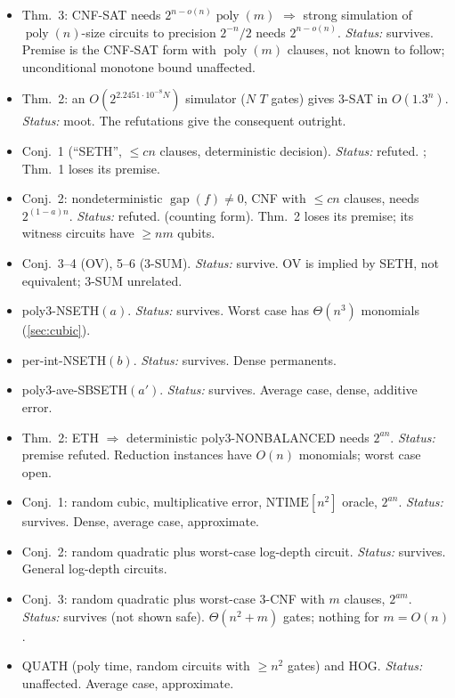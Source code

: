 \documentclass[10pt]{amsart}
\theoremstyle{plain}
\theoremstyle{definition}
\theoremstyle{remark}
\numberwithin{equation}{section}
\newcommand{\poly}{\operatorname{poly}}
\newcommand{\gap}{\operatorname{gap}}
\begin{document}
{\begin{itemize}[leftmargin=2.2em,itemsep=2pt]
\item[10.] \cite{HNS18} Thm.~3: CNF-SAT needs $2^{n-o(n)}\poly(m)$ $\Rightarrow$ strong simulation of $\poly(n)$-size circuits to precision $2^{-n}/2$ needs $2^{n-o(n)}$. \emph{Status:} survives. Premise is the CNF-SAT form with $\poly(m)$ clauses, not known to follow; unconditional monotone bound unaffected.
\item[11.] \cite{HNS19} Thm.~2: an $O(2^{2.2451\cdot10^{-8}N})$ simulator ($N$ $T$ gates) gives $3$-SAT in $O(1.3^n)$. \emph{Status:} moot. The refutations give the consequent outright.
\item[12.] \cite{MT19b} Conj.~1 (``SETH'', $\le cn$ clauses, deterministic decision). \emph{Status:} refuted. ; Thm.~1 loses its premise.
\item[13.] \cite{MT19b} Conj.~2: nondeterministic $\gap(f)\ne0$, CNF with $\le cn$ clauses, needs $2^{(1-a)n}$. \emph{Status:} refuted.  (counting form). Thm.~2 loses its premise; its witness circuits have $\ge nm$ qubits.
\item[14.] \cite{MT19b} Conj.~3--4 (OV), 5--6 ($3$-SUM). \emph{Status:} survive. OV is implied by SETH, not equivalent; $3$-SUM unrelated.
\item[15.] \cite{DHKL20} poly3-NSETH$(a)$. \emph{Status:} survives. Worst case has $\Theta(n^3)$ monomials (\cref{sec:cubic}).
\item[16.] \cite{DHKL20} per-int-NSETH$(b)$. \emph{Status:} survives. Dense permanents.
\item[17.] \cite{DHKL20} poly3-ave-SBSETH$(a')$. \emph{Status:} survives. Average case, dense, additive error.
\item[18.] \cite{DHKL20} Thm.~2: ETH $\Rightarrow$ deterministic poly3-NONBALANCED needs $2^{an}$. \emph{Status:} premise refuted. Reduction instances have $O(n)$ monomials; worst case open.
\item[19.] \cite{MT20} Conj.~1: random cubic, multiplicative error, $\mathrm{NTIME}[n^2]$ oracle, $2^{an}$. \emph{Status:} survives. Dense, average case, approximate.
\item[20.] \cite{MT20} Conj.~2: random quadratic plus worst-case log-depth circuit. \emph{Status:} survives. General log-depth circuits.
\item[21.] \cite{MT20} Conj.~3: random quadratic plus worst-case $3$-CNF with $m$ clauses, $2^{am}$. \emph{Status:} survives (not shown safe). $\Theta(n^2+m)$ gates; nothing for $m=O(n)$.
\item[22.] \cite{AC17} QUATH (poly time, random circuits with $\ge n^2$ gates) and HOG. \emph{Status:} unaffected. Average case, approximate.

\end{itemize}}
\end{document}
